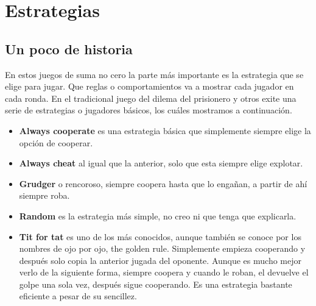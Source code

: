 \documentclass{article}
\begin{document}
\section{Estrategias}
\subsection{Un poco de historia}
En estos juegos de suma no cero la parte m\'as importante es la estrategia que se elige para jugar. Que reglas o comportamientos va a mostrar cada jugador en cada ronda.
En el tradicional juego del dilema del prisionero y otros exite una serie de estrategias o jugadores b\'asicos, los cu\'ales mostramos a continuaci\'on.
\begin{itemize}
      \item \textbf{Always cooperate} es una estrategia b\'asica que simplemente siempre elige la opci\'on de cooperar.
      \item \textbf{Always cheat} al igual que la anterior, solo que esta siempre elige explotar.
      \item \textbf{Grudger} o rencoroso, siempre coopera hasta que lo enga\~nan, a partir de ah\'i siempre roba.
      \item \textbf{Random} es la estrategia m\'as simple, no creo ni que tenga que explicarla.
      \item \textbf{Tit for tat} es uno de los m\'as conocidos, aunque tambi\'en se conoce por los nombres de ojo por ojo, the golden rule. Simplemente empieza cooperando
            y despu\'es solo copia la anterior jugada del oponente. Aunque es mucho mejor verlo de la siguiente forma, siempre coopera y cuando le roban, el devuelve el
            golpe una sola vez, despu\'es sigue cooperando. Es una estrategia bastante eficiente a pesar de su sencillez.
\end{itemize}
\end{document}
